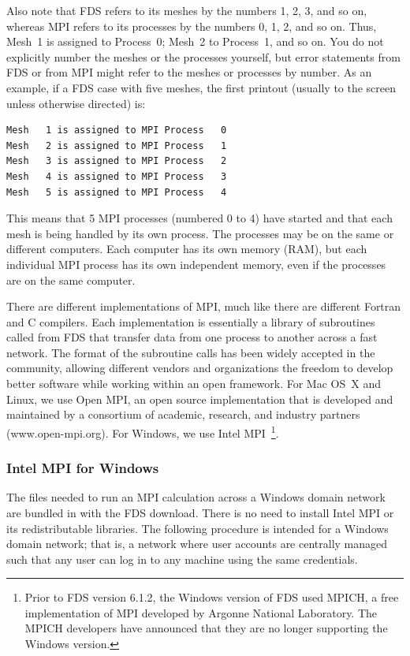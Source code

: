 \documentclass[11pt]{book}
\begin{document}
Also note that FDS refers to its meshes by the numbers 1, 2, 3, and so on, whereas MPI refers to its processes by the numbers 0, 1, 2, and so on. Thus, Mesh~1 is assigned to Process~0; Mesh~2 to Process~1, and so on. You do not explicitly number the meshes or the processes yourself, but error statements from FDS or from MPI might refer to the meshes or processes by number. As an example, if a FDS case with five meshes, the first printout (usually to the screen unless otherwise directed) is:
\begin{lstlisting}
Mesh   1 is assigned to MPI Process   0
Mesh   2 is assigned to MPI Process   1
Mesh   3 is assigned to MPI Process   2
Mesh   4 is assigned to MPI Process   3
Mesh   5 is assigned to MPI Process   4
\end{lstlisting}
This means that 5 MPI processes (numbered 0 to 4) have started and that each mesh is being handled by its own process. The processes may be on the same or different computers. Each computer has its own memory (RAM), but each individual MPI process has its own independent memory, even if the processes are on the same computer.

There are different implementations of MPI, much like there are different Fortran and C compilers. Each implementation is essentially a library of subroutines called from FDS that transfer data from one process to another across a fast network. The format of the subroutine calls has been widely accepted in the community, allowing different vendors and organizations the freedom to develop better software while working within an open framework. For Mac OS~X and Linux, we use Open MPI, an open source implementation that is developed and maintained by a consortium of academic, research, and industry partners (www.open-mpi.org). For Windows, we use Intel MPI~\footnote{Prior to FDS version 6.1.2, the Windows version of FDS used MPICH, a free implementation of MPI developed by Argonne National Laboratory. The MPICH developers have announced that they are no longer supporting the Windows version.}.

\subsubsection{Intel MPI for Windows}

The files needed to run an MPI calculation across a Windows domain network are bundled in with the FDS download. There is no need to install Intel MPI or its redistributable libraries. The following procedure is intended for a Windows domain network; that is, a network where user accounts are centrally managed such that any user can log in to any machine using the same credentials.
\end{document}
